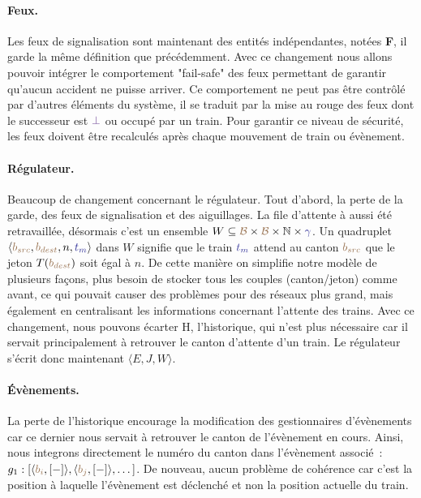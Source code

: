 \documentclass[oneside, a4paper, 11pt]{book}
\newcommand{\nats}{\ensuremath{\mathbb{N}}}
\newcommand{\trainFmt}[1]{{\color{traincolor} #1}}
\newcommand{\tid}[1]{\ensuremath{\trainFmt{t_{#1}}}}
\newcommand{\posFmt}[1]{{\color{poscolor}{#1}}}
\newcommand{\bid}[1]{\ensuremath{\posFmt{b_{#1}}}}
\newcommand{\tokenOf}[1]{\ensuremath{T(\posFmt{#1})}}
\newcommand{\swFmt}[1]{{\color{swcolor}{#1}}}
\newcommand{\nosuc}{\ensuremath{\swFmt{\bot}}}
\begin{document}
\paragraph{Feux.}Les feux de signalisation sont maintenant des entités indépendantes, notées \textbf{F}, il garde la même définition que précédemment. Avec ce changement nous allons pouvoir intégrer le comportement "fail-safe" des feux permettant de garantir qu'aucun accident ne puisse arriver.
Ce comportement ne peut pas être contrôlé par d'autres éléments du système, il se traduit par la mise au rouge des feux dont le successeur est $\nosuc$ ou occupé par un train. 
Pour garantir ce niveau de sécurité, les feux doivent être recalculés après chaque mouvement de train ou évènement.


\paragraph{Régulateur.} Beaucoup de changement concernant le régulateur. Tout d'abord, la perte de la garde, des feux de signalisation et des aiguillages. La file d'attente à aussi été retravaillée, désormais c'est un ensemble $W \subseteq \posFmt{\mathcal{B}} \times \posFmt{\mathcal{B}} \times \nats \times \trainFmt{\gamma}$. Un quadruplet $\langle \bid{src}, \bid{dest}, n, \tid{m} \rangle$ dans $W$ signifie que le train \tid{m} attend au canton \bid{src} que le jeton \tokenOf{\bid{dest}} soit égal à $n$.
De cette manière on simplifie notre modèle de plusieurs façons, plus besoin de stocker tous les couples (canton/jeton) comme avant, ce qui pouvait causer des problèmes pour des réseaux plus grand, mais également en centralisant les informations concernant l'attente des trains. Avec ce changement, nous pouvons écarter H, l'historique, qui n'est plus nécessaire car il servait principalement à retrouver le canton d'attente d'un train.
Le régulateur s'écrit donc maintenant $\langle E, J, W \rangle$.

\paragraph{Évènements.} La perte de l'historique encourage la modification des gestionnaires d'évènements car ce dernier nous servait à retrouver le canton de l'évènement en cours. Ainsi, nous integrons directement le numéro du canton dans l'évènement associé~: $g_1 : [\langle \bid{i}, [-]\rangle, \langle \bid{j}, [-]\rangle,\dots]$.
De nouveau, aucun problème de cohérence car c'est la position à laquelle l'évènement est déclenché et non la position actuelle du train.
\end{document}
